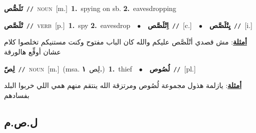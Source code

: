 \documentclass[10pt,a4paper,twoside]{article} %
\begin{document}
\begin{multicols}{2}
{\setlength\topsep{0pt}\textbf{\foreignlanguage{arabic}{تَلَصُّص}}\ {\color{gray}\texttt{//}\color{black}}\ \textsc{noun}\ [m.]\ \textbf{1.}~spying on sb.  \textbf{2.}~eavesdropping\ } \vspace{2mm}

{\setlength\topsep{0pt}\textbf{\foreignlanguage{arabic}{تْلَصَّص}}\ {\color{gray}\texttt{//}\color{black}}\ \textsc{verb}\ [p.]\ \textbf{1.}~spy  \textbf{2.}~eavesdrop\ \ $\bullet$\ \ \setlength\topsep{0pt}\textbf{\foreignlanguage{arabic}{اِتْلَصَّص}}\ {\color{gray}\texttt{//}\color{black}}\ [c.]\ \ $\bullet$\ \ \setlength\topsep{0pt}\textbf{\foreignlanguage{arabic}{يِتْلَصَّص}}\ {\color{gray}\texttt{//}\color{black}}\ [i.]\  \begin{flushright}\color{gray}\foreignlanguage{arabic}{\textbf{\underline{\foreignlanguage{arabic}{أمثلة}}}: مش قصدي أتْلَصَّص عليكم والله كان الباب مفتوح وكنت مستنيكم تخلصوا كلام عشان أوقِّع هالورقة}\end{flushright}\color{black}} \vspace{2mm}

{\setlength\topsep{0pt}\textbf{\foreignlanguage{arabic}{لِصّ}}\ {\color{gray}\texttt{//}\color{black}}\ \textsc{noun}\ [m.]\ \color{gray}(msa. \foreignlanguage{arabic}{لِص}~\foreignlanguage{arabic}{\textbf{١.}})\color{black}\ \textbf{1.}~thief\ \ $\bullet$\ \ \setlength\topsep{0pt}\textbf{\foreignlanguage{arabic}{لُصُوص}}\ {\color{gray}\texttt{//}\color{black}}\ [pl.]\  \begin{flushright}\color{gray}\foreignlanguage{arabic}{\textbf{\underline{\foreignlanguage{arabic}{أمثلة}}}: يازلمة هذول مجموعة لُصُوص ومرتزقة الله ينتقم منهم همي اللي خربوا البلد بفسادهم}\end{flushright}\color{black}} \vspace{2mm}

\vspace{-3mm}
\subsection*{\color{blue}\foreignlanguage{arabic}{ل.ص.م}\color{blue}{}} 


\end{multicols}
\end{document}
